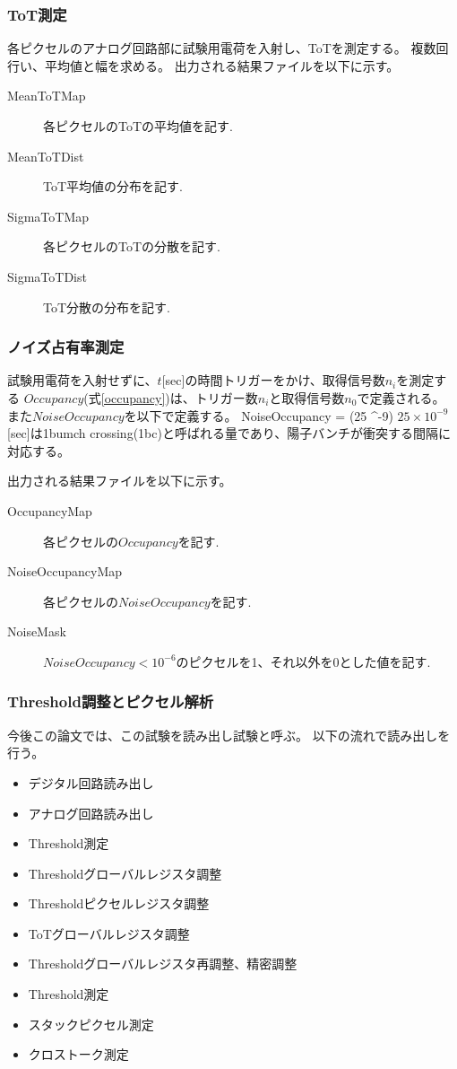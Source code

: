 \subsubsection{ToT測定}
各ピクセルのアナログ回路部に試験用電荷を入射し、ToTを測定する。
複数回行い、平均値と幅を求める。
出力される結果ファイルを以下に示す。
\begin{description}
  \item [MeanToTMap] 各ピクセルのToTの平均値を記す.
  \item [MeanToTDist] ToT平均値の分布を記す. 
  \item [SigmaToTMap] 各ピクセルのToTの分散を記す.
  \item [SigmaToTDist] ToT分散の分布を記す.
\end{description}

\subsubsection{ノイズ占有率測定}
試験用電荷を入射せずに、$t$[sec]の時間トリガーをかけ、取得信号数$n_i$を測定する
$Occupancy$(式\ref{occupancy})は、トリガー数$n_i$と取得信号数$n_0$で定義される。
また$NoiseOccupancy$を以下で定義する。
\bbb
NoiseOccupancy =  \times (25 ^{-9})
\eee
$25 \times 10^{-9}$[sec]は1bumch crossing(1bc)と呼ばれる量であり、陽子バンチが衝突する間隔に対応する。

出力される結果ファイルを以下に示す。
\begin{description}
  \item [OccupancyMap] 各ピクセルの$Occupancy$を記す.
  \item [NoiseOccupancyMap] 各ピクセルの$NoiseOccupancy$を記す.
  \item [NoiseMask] $NoiseOccupancy < 10^{-6}$のピクセルを1、それ以外を0とした値を記す.
\end{description}
  
\subsubsection{Threshold調整とピクセル解析}\label{sec:pixel_analysis}
今後この論文では、この試験を読み出し試験と呼ぶ。
以下の流れで読み出しを行う。
\begin{itemize}
  \item デジタル回路読み出し
  \item アナログ回路読み出し
  \item Threshold測定
  \item Thresholdグローバルレジスタ調整
  \item Thresholdピクセルレジスタ調整
  \item ToTグローバルレジスタ調整
  \item Thresholdグローバルレジスタ再調整、精密調整
  \item Threshold測定
  \item スタックピクセル測定
  \item クロストーク測定
\end{itemize}

